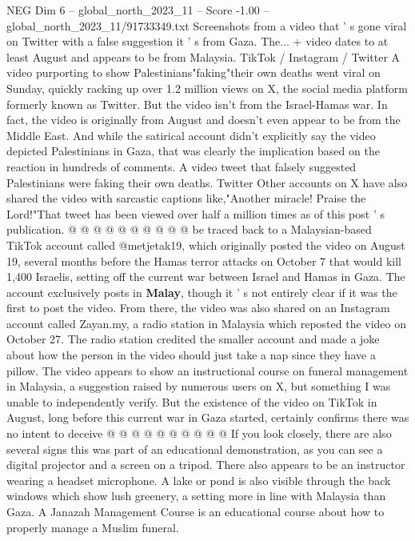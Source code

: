 \begin{textsample}{NEG Dim 6 – global\_north\_2023\_11 – Score -1.00 – global\_north\_2023\_11/91733349.txt}  \label{ex:f6_neg_198}
Screenshots from a video that ' s gone viral on Twitter with a false suggestion it ' s from Gaza.
The... + video dates to at least August and appears to be from Malaysia.
TikTok / Instagram / Twitter A video purporting to show Palestinians"faking"their own deaths went viral on Sunday, quickly racking up over 1.2 million views on X, the social media platform formerly known as Twitter.
But the video isn't from the Israel-Hamas war.
In fact, the video is originally from August and doesn't even appear to be from the Middle East.
And while the satirical account didn't explicitly say the video depicted Palestinians in Gaza, that was clearly the implication based on the reaction in hundreds of comments.
A video tweet that falsely suggested Palestinians were faking their own deaths.
Twitter Other accounts on X have also shared the video with sarcastic captions like,"Another miracle!
Praise the Lord!"That tweet has been viewed over half a million times as of this post ' s publication. @ @ @ @ @ @ @ @ @ @ be traced back to a Malaysian-based TikTok account called @metjetak19, which originally posted the video on August 19, several months before the Hamas terror attacks on October 7 that would kill 1,400 Israelis, setting off the current war between Israel and Hamas in Gaza.
The account exclusively posts in \textbf{Malay}, though it ' s not entirely clear if it was the first to post the video.
From there, the video was also shared on an Instagram account called Zayan.my, a radio station in Malaysia which reposted the video on October 27.
The radio station credited the smaller account and made a joke about how the person in the video should just take a nap since they have a pillow.
The video appears to show an instructional course on funeral management in Malaysia, a suggestion raised by numerous users on X, but something I was unable to independently verify.
But the existence of the video on TikTok in August, long before this current war in Gaza started, certainly confirms there was no intent to deceive @ @ @ @ @ @ @ @ @ @ If you look closely, there are also several signs this was part of an educational demonstration, as you can see a digital projector and a screen on a tripod.
There also appears to be an instructor wearing a headset microphone.
A lake or pond is also visible through the back windows which show lush greenery, a setting more in line with Malaysia than Gaza.
A Janazah Management Course is an educational course about how to properly manage a Muslim funeral.

\end{textsample}
